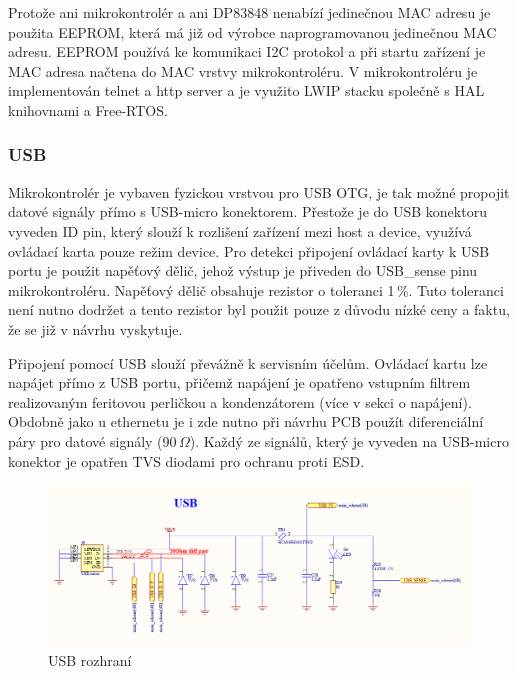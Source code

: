     Protože ani mikrokontrolér a ani DP83848 nenabízí jedinečnou MAC adresu je použita EEPROM,
    která má již od výrobce naprogramovanou jedinečnou MAC adresu.
    EEPROM používá ke komunikaci I2C protokol a při startu zařízení je MAC adresa
    načtena do MAC vrstvy mikrokontroléru. V mikrokontroléru je implementován telnet
    a http server a je využito LWIP stacku společně s HAL knihovnami a Free-RTOS.\par

    \subsubsection{USB}
    Mikrokontrolér je vybaven fyzickou vrstvou pro USB OTG,
    je tak možné propojit datové signály přímo s USB-micro konektorem.
    Přestože je do USB konektoru vyveden ID pin, který slouží
    k rozlišení zařízení mezi host a device, využívá ovládací karta pouze režim device.
    Pro detekci připojení ovládací karty k USB portu je použit napěťový dělič, jehož výstup
    je přiveden do USB\_sense pinu mikrokontroléru. Napěťový dělič obsahuje rezistor o toleranci
    1\,\%. Tuto toleranci není nutno dodržet a tento rezistor byl použit pouze z důvodu nízké ceny
    a faktu, že se již v návrhu vyskytuje.\par

    Připojení pomocí USB slouží převážně k servisním účelům.
    Ovládací kartu lze napájet přímo z USB portu, přičemž napájení je opatřeno
    vstupním filtrem realizovaným feritovou perličkou a kondenzátorem (více v sekci o napájení).
    Obdobně jako u ethernetu je i zde nutno při návrhu PCB použít diferenciální páry
    pro datové signály (90\,$\Omega$). Každý ze signálů,
    který je vyveden na USB-micro konektor je opatřen TVS diodami pro ochranu
    proti ESD.\par

    \begin{figure}[ht!]
        \centering
        \includegraphics[width = 1\textwidth]{obrazky/USB.png}
        \caption{USB rozhraní}
        \label{fig: USB rozhraní}
    \end{figure}


